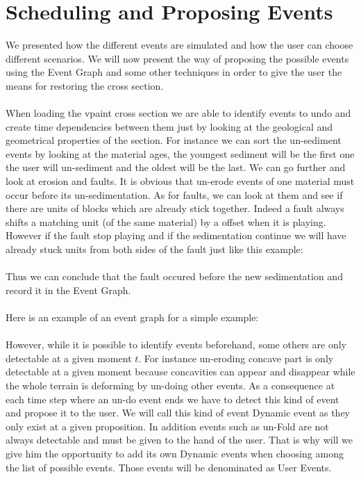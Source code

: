 \documentclass[12pt, a4paper]{memoir} %
\begin{document}
\section{Scheduling and Proposing Events}

We presented how the different events are simulated and how the user can choose different scenarios. We will now present the way of proposing the possible events using the Event Graph and some other techniques in order to give the user the means for restoring the cross section.\\\\

When loading the vpaint cross section we are able to identify events to undo  and create time dependencies between them just by looking at the geological and geometrical properties of the section. For instance we can sort the un-sediment events by looking at the material ages, the youngest sediment will be the first one the user will un-sediment and the oldest will be the last. We can go further and look at erosion and faults. It is obvious that un-erode events of one material must occur before its un-sedimentation. As for faults, we can look at them and see if there are units of blocks which are already stick together. Indeed a fault always shifts a matching unit (of the same material) by a offset when it is playing. However if the fault stop playing and if the sedimentation continue we will have already stuck units from both sides of the fault just like this example:\\\\

Thus we can conclude that the fault occured before the new sedimentation and record it in the Event Graph.\\\\

Here is an example of an event graph for a simple example:\\\\

However, while it is possible to identify events beforehand, some others are only detectable at a given moment $t$. For instance un-eroding concave part is only detectable at a given moment because concavities can appear and disappear while the whole terrain is deforming by un-doing other events. As a consequence at each time step where an un-do event ends we have to detect this kind of event and propose it to the user. We will call this kind of event Dynamic event as they only exist at a given proposition. In addition events such as un-Fold are not always detectable and must be given to the hand of the user. That is why will we give him the opportunity to add its own Dynamic events when choosing among the list of possible events. Those events will be denominated as User Events.\\\\
\end{document}
